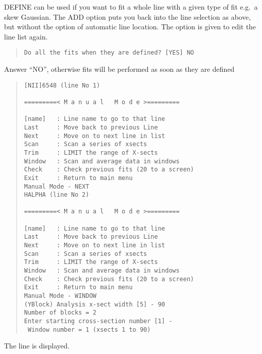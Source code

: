 DEFINE can be used if you want to fit a whole line with a given type of
fit e.g.\ a skew Gaussian.
The ADD option puts you back into the line selection as above, but
without the option of automatic line location.
The option is given to edit the line list again.
\begin{quote}\begin{verbatim}
Do all the fits when they are defined? [YES] NO
\end{verbatim}\end{quote}
Answer ``NO'', otherwise fits will be performed as soon as they are
defined
\begin{quote}\begin{verbatim}
[NII]6548 (line No 1)
 
=========< M a n u a l   M o d e >=========
 
[name]   : Line name to go to that line
Last     : Move back to previous Line
Next     : Move on to next line in list
Scan     : Scan a series of xsects
Trim     : LIMIT the range of X-sects
Window   : Scan and average data in windows
Check    : Check previous fits (20 to a screen)
Exit     : Return to main menu
Manual Mode - NEXT
HALPHA (line No 2)
 
=========< M a n u a l   M o d e >=========
 
[name]   : Line name to go to that line
Last     : Move back to previous Line
Next     : Move on to next line in list
Scan     : Scan a series of xsects
Trim     : LIMIT the range of X-sects
Window   : Scan and average data in windows
Check    : Check previous fits (20 to a screen)
Exit     : Return to main menu
Manual Mode - WINDOW
(YBlock) Analysis x-sect width [5] - 90
Number of blocks = 2
Enter starting cross-section number [1] -
 Window number = 1 (xsects 1 to 90)
\end{verbatim}\end{quote}
The line is displayed.

